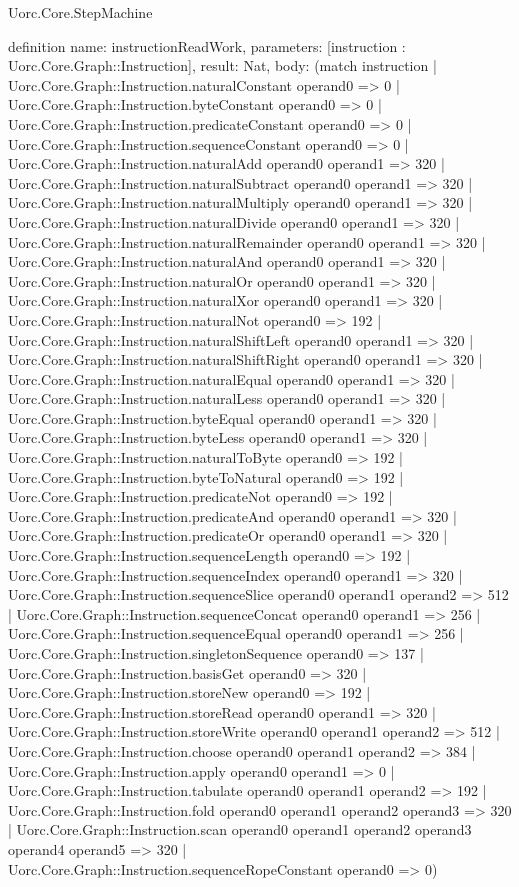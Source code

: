 \begin{lexlean}{Uorc.Core.StepMachine}
\begin{semanticmodule}
definition{
  name: instructionReadWork,
  parameters: [instruction : Uorc.Core.Graph::Instruction],
  result: Nat,
  body: (match instruction
    | Uorc.Core.Graph::Instruction.naturalConstant operand0 => 0
    | Uorc.Core.Graph::Instruction.byteConstant operand0 => 0
    | Uorc.Core.Graph::Instruction.predicateConstant operand0 => 0
    | Uorc.Core.Graph::Instruction.sequenceConstant operand0 => 0
    | Uorc.Core.Graph::Instruction.naturalAdd operand0 operand1 => 320
    | Uorc.Core.Graph::Instruction.naturalSubtract operand0 operand1 => 320
    | Uorc.Core.Graph::Instruction.naturalMultiply operand0 operand1 => 320
    | Uorc.Core.Graph::Instruction.naturalDivide operand0 operand1 => 320
    | Uorc.Core.Graph::Instruction.naturalRemainder operand0 operand1 => 320
    | Uorc.Core.Graph::Instruction.naturalAnd operand0 operand1 => 320
    | Uorc.Core.Graph::Instruction.naturalOr operand0 operand1 => 320
    | Uorc.Core.Graph::Instruction.naturalXor operand0 operand1 => 320
    | Uorc.Core.Graph::Instruction.naturalNot operand0 => 192
    | Uorc.Core.Graph::Instruction.naturalShiftLeft operand0 operand1 => 320
    | Uorc.Core.Graph::Instruction.naturalShiftRight operand0 operand1 => 320
    | Uorc.Core.Graph::Instruction.naturalEqual operand0 operand1 => 320
    | Uorc.Core.Graph::Instruction.naturalLess operand0 operand1 => 320
    | Uorc.Core.Graph::Instruction.byteEqual operand0 operand1 => 320
    | Uorc.Core.Graph::Instruction.byteLess operand0 operand1 => 320
    | Uorc.Core.Graph::Instruction.naturalToByte operand0 => 192
    | Uorc.Core.Graph::Instruction.byteToNatural operand0 => 192
    | Uorc.Core.Graph::Instruction.predicateNot operand0 => 192
    | Uorc.Core.Graph::Instruction.predicateAnd operand0 operand1 => 320
    | Uorc.Core.Graph::Instruction.predicateOr operand0 operand1 => 320
    | Uorc.Core.Graph::Instruction.sequenceLength operand0 => 192
    | Uorc.Core.Graph::Instruction.sequenceIndex operand0 operand1 => 320
    | Uorc.Core.Graph::Instruction.sequenceSlice operand0 operand1 operand2 => 512
    | Uorc.Core.Graph::Instruction.sequenceConcat operand0 operand1 => 256
    | Uorc.Core.Graph::Instruction.sequenceEqual operand0 operand1 => 256
    | Uorc.Core.Graph::Instruction.singletonSequence operand0 => 137
    | Uorc.Core.Graph::Instruction.basisGet operand0 => 320
    | Uorc.Core.Graph::Instruction.storeNew operand0 => 192
    | Uorc.Core.Graph::Instruction.storeRead operand0 operand1 => 320
    | Uorc.Core.Graph::Instruction.storeWrite operand0 operand1 operand2 => 512
    | Uorc.Core.Graph::Instruction.choose operand0 operand1 operand2 => 384
    | Uorc.Core.Graph::Instruction.apply operand0 operand1 => 0
    | Uorc.Core.Graph::Instruction.tabulate operand0 operand1 operand2 => 192
    | Uorc.Core.Graph::Instruction.fold operand0 operand1 operand2 operand3 => 320
    | Uorc.Core.Graph::Instruction.scan operand0 operand1 operand2 operand3 operand4 operand5 => 320
    | Uorc.Core.Graph::Instruction.sequenceRopeConstant operand0 => 0)
}


\end{semanticmodule}
\end{lexlean}
